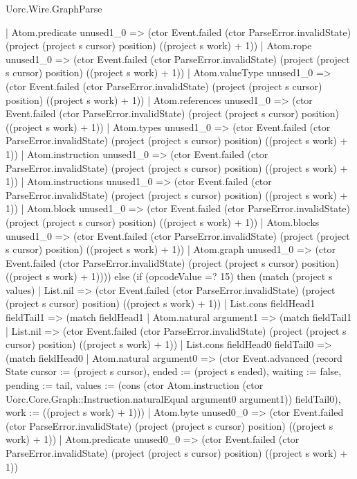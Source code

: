 \begin{lexlean}{Uorc.Wire.GraphParse}
\begin{semanticmodule}
{          | Atom.predicate unused1_0 => (ctor Event.failed (ctor ParseError.invalidState) (project (project s cursor) position) ((project s work) + 1))
          | Atom.rope unused1_0 => (ctor Event.failed (ctor ParseError.invalidState) (project (project s cursor) position) ((project s work) + 1))
          | Atom.valueType unused1_0 => (ctor Event.failed (ctor ParseError.invalidState) (project (project s cursor) position) ((project s work) + 1))
          | Atom.references unused1_0 => (ctor Event.failed (ctor ParseError.invalidState) (project (project s cursor) position) ((project s work) + 1))
          | Atom.types unused1_0 => (ctor Event.failed (ctor ParseError.invalidState) (project (project s cursor) position) ((project s work) + 1))
          | Atom.instruction unused1_0 => (ctor Event.failed (ctor ParseError.invalidState) (project (project s cursor) position) ((project s work) + 1))
          | Atom.instructions unused1_0 => (ctor Event.failed (ctor ParseError.invalidState) (project (project s cursor) position) ((project s work) + 1))
          | Atom.block unused1_0 => (ctor Event.failed (ctor ParseError.invalidState) (project (project s cursor) position) ((project s work) + 1))
          | Atom.blocks unused1_0 => (ctor Event.failed (ctor ParseError.invalidState) (project (project s cursor) position) ((project s work) + 1))
          | Atom.graph unused1_0 => (ctor Event.failed (ctor ParseError.invalidState) (project (project s cursor) position) ((project s work) + 1)))) else (if (opcodeValue =? 15) then (match (project s values)
        | List.nil => (ctor Event.failed (ctor ParseError.invalidState) (project (project s cursor) position) ((project s work) + 1))
        | List.cons fieldHead1 fieldTail1 => (match fieldHead1
          | Atom.natural argument1 => (match fieldTail1
            | List.nil => (ctor Event.failed (ctor ParseError.invalidState) (project (project s cursor) position) ((project s work) + 1))
            | List.cons fieldHead0 fieldTail0 => (match fieldHead0
              | Atom.natural argument0 => (ctor Event.advanced (record State {cursor := (project s cursor), ended := (project s ended), waiting := false, pending := tail, values := (cons (ctor Atom.instruction (ctor Uorc.Core.Graph::Instruction.naturalEqual argument0 argument1)) fieldTail0), work := ((project s work) + 1)}))
              | Atom.byte unused0_0 => (ctor Event.failed (ctor ParseError.invalidState) (project (project s cursor) position) ((project s work) + 1))
              | Atom.predicate unused0_0 => (ctor Event.failed (ctor ParseError.invalidState) (project (project s cursor) position) ((project s work) + 1))
}
\end{semanticmodule}
\end{lexlean}
